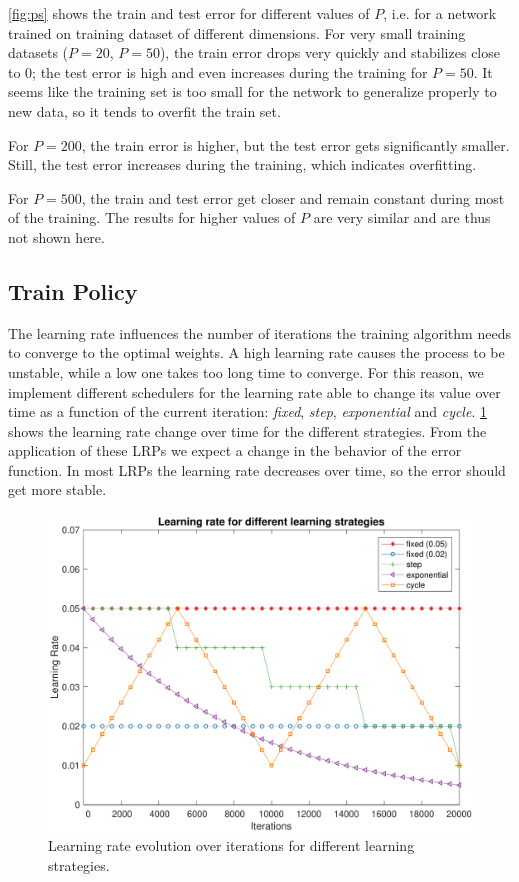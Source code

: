 \cref{fig:ps} shows the train and test error for different values of $P$, i.e. for a network trained on training dataset of different dimensions.
For very small training datasets ($P = 20$, $P = 50$), the train error drops very quickly and stabilizes close to $0$;
the test error is high and even increases during the training for $P = 50$.
It seems like the training set is too small for the network to generalize properly to new data, so it tends to overfit the train set.

For $P = 200$, the train error is higher, but the test error gets significantly smaller.
Still, the test error increases during the training, which indicates overfitting.

For $P = 500$, the train and test error get closer and remain constant during most of the training.
The results for higher values of $P$ are very similar and are thus not shown here.

\subsection{Train Policy}
The learning rate influences the number of iterations the training algorithm needs to converge to the optimal weights.
A high learning rate causes the process to be unstable, while a low one takes too long time to converge.
For this reason, we implement different schedulers for the learning rate able to change its value over time as a function of the current iteration: \textit{fixed}, \textit{step}, \textit{exponential} and \textit{cycle}.
\cref{fig:learning_rates_policies} shows the learning rate change over time for the different strategies.
From the application of these \ac{LRPs} we expect a change in the behavior of the error function.
In most \ac{LRPs} the learning rate decreases over time, so the error should get more stable.

\begin{figure}
	\centering
	\includegraphics[width=\columnwidth]{figures/learning_rates}
	\caption{Learning rate evolution over iterations for different learning strategies.}
	\label{fig:learning_rates_policies}
\end{figure}

